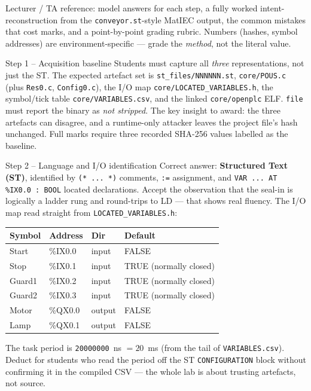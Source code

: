 \documentclass[11pt,a4paper]{article}
\begin{document}
\labheader

\begin{goalbox}
Lecturer / TA reference: model answers for each step, a fully worked
intent-reconstruction from the \texttt{conveyor.st}-style MatIEC output, the
common mistakes that cost marks, and a point-by-point grading rubric.
Numbers (hashes, symbol addresses) are environment-specific --- grade the
\emph{method}, not the literal value.
\end{goalbox}

\begin{solutionbox}{Step 1 -- Acquisition baseline}
Students must capture all \emph{three} representations, not just the ST.
The expected artefact set is \texttt{st\_files/NNNNNN.st},
\texttt{core/POUS.c} (plus \texttt{Res0.c}, \texttt{Config0.c}), the I/O
map \texttt{core/LOCATED\_VARIABLES.h}, the symbol/tick table
\texttt{core/VARIABLES.csv}, and the linked \texttt{core/openplc} ELF.
\texttt{file} must report the binary as \emph{not stripped}. The key
insight to award: the three artefacts can disagree, and a runtime-only
attacker leaves the project file's hash unchanged. Full marks require three
recorded SHA-256 values labelled as the baseline.
\end{solutionbox}

\begin{solutionbox}{Step 2 -- Language and I/O identification}
Correct answer: \textbf{Structured Text (ST)}, identified by
\texttt{(* ... *)} comments, \texttt{:=} assignment, and
\texttt{VAR ... AT \%IX0.0 : BOOL} located declarations. Accept the
observation that the seal-in is logically a ladder rung and round-trips to
LD --- that shows real fluency. The I/O map read straight from
\texttt{LOCATED\_VARIABLES.h}:
\begin{center}
\footnotesize
\begin{tabular}{@{}llll@{}}
\toprule
\textbf{Symbol} & \textbf{Address} & \textbf{Dir} & \textbf{Default} \\
\midrule
Start  & \%IX0.0 & input  & FALSE \\
Stop   & \%IX0.1 & input  & TRUE (normally closed) \\
Guard1 & \%IX0.2 & input  & TRUE (normally closed) \\
Guard2 & \%IX0.3 & input  & TRUE (normally closed) \\
Motor  & \%QX0.0 & output & FALSE \\
Lamp   & \%QX0.1 & output & FALSE \\
\bottomrule
\end{tabular}
\end{center}
The task period is \texttt{20000000}~ns $= 20$~ms (from the tail of
\texttt{VARIABLES.csv}). Deduct for students who read the period off the ST
\texttt{CONFIGURATION} block without confirming it in the compiled CSV ---
the whole lab is about trusting artefacts, not source.
\end{solutionbox}
\end{document}
